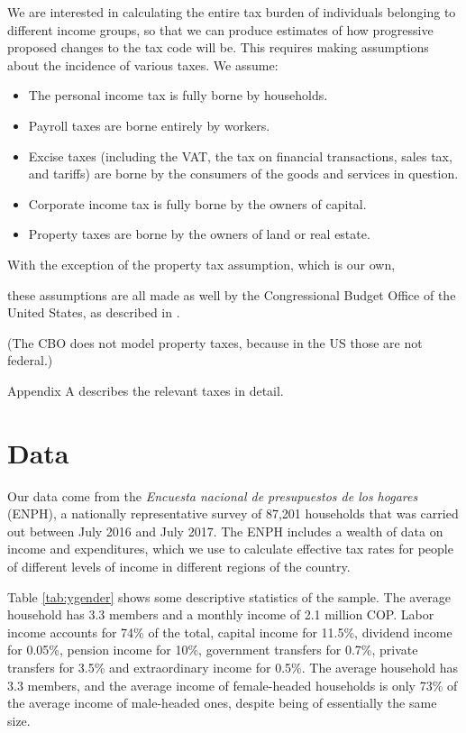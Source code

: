 \documentclass[12pt]{article}
\begin{document}
We are interested in calculating
the entire tax burden of individuals belonging to different income groups,
so that we can produce estimates of
how progressive proposed changes to the tax code will be.
This requires making assumptions about
the incidence of various taxes. We assume:

\begin{itemize}
  \item The personal income tax is fully borne by households.
  \item Payroll taxes are borne entirely by workers.
  \item Excise taxes
    (including the VAT,
    the tax on financial transactions,
    sales tax, and tariffs)
    are borne by the consumers of the goods and services in question.
  \item Corporate income tax is fully borne by the owners of capital.
  \item Property taxes are borne by
    the owners of land or real estate.
\end{itemize}

With the exception of the property tax assumption,
which is our own,
\iffalse
    [[LUIS:
        It is, right?]]
\fi
these assumptions are all made as well by
the Congressional Budget Office of the United States,
as described in \citet{salanie}.
\iffalse
    [[AN ECONOMIST::
        Who is salamie? That string only appears once in the entire document.
        --jbb]]
\fi
(The CBO does not model property taxes,
because in the US those are not federal.)

Appendix A describes the relevant taxes in detail.

\section{Data}
Our data come from the
\textit{Encuesta nacional de presupuestos de los hogares} (ENPH),
a nationally representative survey of 87,201 households
that was carried out between July 2016 and July 2017.
The ENPH includes a wealth of data on income and expenditures,
which we use to calculate effective tax rates for
people of different levels of income in different regions of the country.

\iffalse
[[SOMEONE:
    Double-check each of these figures
    against the table it comes from.]]
[[JEFF:
    Since the underlying data is cleaner now,
    either regenerate the table
    or verify that the Makefile regenerates it.]]
\fi

Table \ref{tab:ygender} shows some descriptive statistics of the sample.
The average household has 3.3 members and a monthly income of 2.1 million COP.
Labor income accounts for 74\% of the total,
capital income for 11.5\%,
dividend income for 0.05\%,
pension income for 10\%,
government transfers for 0.7\%,
private transfers for 3.5\%
and extraordinary income for 0.5\%.
The average household has 3.3 members,
and the average income of female-headed households
is only 73\% of the average income of male-headed ones,
despite being of essentially the same size.
\end{document}
